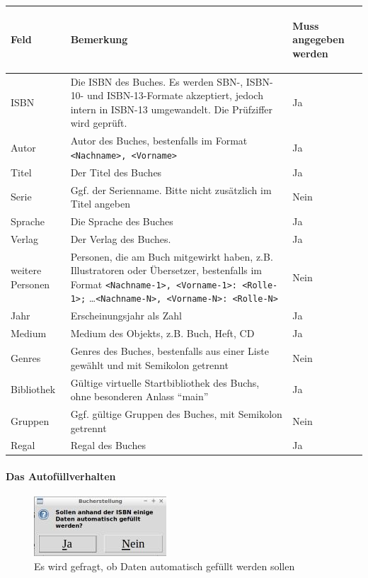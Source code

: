 \begin{tabular}{|p{}|p{}|p{}|}\hline
\begin{center}Feld\end{center} & \begin{center}Bemerkung\end{center} & \begin{center}Muss angegeben werden\end{center}\\
\hline
ISBN & Die ISBN des Buches. Es werden SBN-, ISBN-10- und ISBN-13-Formate akzeptiert, jedoch intern in ISBN-13 umgewandelt. Die Prüfziffer wird geprüft. & Ja\\
\hline
Autor & Autor des Buches, bestenfalls im Format \verb=<Nachname>, <Vorname>= & Ja\\
\hline
Titel & Der Titel des Buches & Ja\\
\hline
Serie & Ggf. der Serienname. Bitte nicht zusätzlich im Titel angeben & Nein\\
\hline
Sprache & Die Sprache des Buches & Ja\\
\hline
Verlag & Der Verlag des Buches. & Ja\\
\hline
weitere Personen & Personen, die am Buch mitgewirkt haben, z.B. Illustratoren oder Übersetzer, bestenfalls im Format \verb=<Nachname-1>, <Vorname-1>: <Rolle-1>;= \ldots \verb=<Nachname-N>, <Vorname-N>: <Rolle-N>= & Nein\\
\hline
Jahr & Erscheinungsjahr als Zahl & Ja\\
\hline
Medium & Medium des Objekts, z.B. Buch, Heft, CD & Ja\\
\hline
Genres & Genres des Buches, bestenfalls aus einer Liste gewählt und mit Semikolon getrennt & Nein\\
\hline
Bibliothek & Gültige virtuelle Startbibliothek des Buchs, ohne besonderen Anlass ``main'' & Ja\\
\hline
Gruppen & Ggf. gültige Gruppen des Buches, mit Semikolon getrennt & Nein\\
\hline
Regal & Regal des Buches & Ja\\
\hline
\end{tabular}

\paragraph{Das Autofüllverhalten}
\begin{figure}\includegraphics{images/gui2/ask_isbn_autofill.jpg}\caption{Es wird gefragt, ob Daten automatisch gefüllt werden sollen}\label{fig:ask_isbn_autofill}\end{figure}

